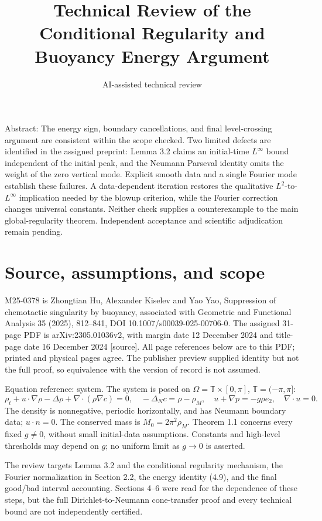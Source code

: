\documentclass[10pt]{article}
\title{Technical Review of the Conditional Regularity and Buoyancy Energy Argument}
\author{AI-assisted technical review}
\date{}
\begin{document}
\maketitle
Abstract: The energy sign, boundary cancellations, and final level-crossing argument are consistent within the scope checked. Two limited defects are identified in the assigned preprint: Lemma 3.2 claims an initial-time \(L^\infty\) bound independent of the initial peak, and the Neumann Parseval identity omits the weight of the zero vertical mode. Explicit smooth data and a single Fourier mode establish these failures. A data-dependent iteration restores the qualitative \(L^2\)-to-\(L^\infty\) implication needed by the blowup criterion, while the Fourier correction changes universal constants. Neither check supplies a counterexample to the main global-regularity theorem. Independent acceptance and scientific adjudication remain pending.\par
\section*{Source, assumptions, and scope}
M25-0378 is Zhongtian Hu, Alexander Kiselev and Yao Yao, Suppression of chemotactic singularity by buoyancy, associated with Geometric and Functional Analysis 35 (2025), 812–841, DOI 10.1007/s00039-025-00706-0. The assigned 31-page PDF is arXiv:2305.01036v2, with margin date 12 December 2024 and title-page date 16 December 2024 [source]. All page references below are to this PDF; printed and physical pages agree. The publisher preview supplied identity but not the full proof, so equivalence with the version of record is not assumed.\par
Equation reference: system. The system is posed on \(\Omega=\mathbb T\times[0,\pi]\), \(\mathbb T=(-\pi,\pi]\): \[
 \rho_t+u\cdot\nabla\rho-\Delta\rho+\nabla\cdot(\rho\nabla c)=0,\quad
 -\Delta_Nc=\rho-\rho_M,\quad
 u+\nabla p=-g\rho e_2,\quad \nabla\cdot u=0.\] The density is nonnegative, periodic horizontally, and has Neumann boundary data; \(u\cdot n=0\). The conserved mass is \(M_0=2\pi^2\rho_M\). Theorem 1.1 concerns every fixed \(g\ne0\), without small initial-data assumptions. Constants and high-level thresholds may depend on \(g\); no uniform limit as \(g\to0\) is asserted.\par
The review targets Lemma 3.2 and the conditional regularity mechanism, the Fourier normalization in Section 2.2, the energy identity (4.9), and the final good/bad interval accounting. Sections 4–6 were read for the dependence of these steps, but the full Dirichlet-to-Neumann cone-transfer proof and every technical bound are not independently certified.\par
\end{document}
